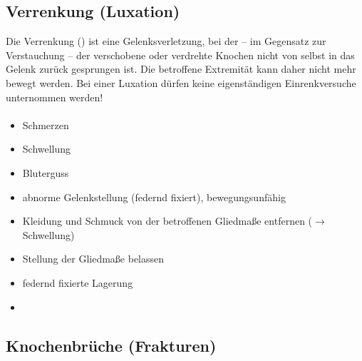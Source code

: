 \subsection{Verrenkung (Luxation)}
\label{topic:verrenkung}


Die Verrenkung () ist eine Gelenksverletzung, bei der -- im Gegensatz
zur Verstauchung -- der verschobene oder verdrehte Knochen nicht von selbst in
das Gelenk zurück gesprungen ist. Die betroffene Extremität kann daher nicht mehr
bewegt werden. Bei einer Luxation dürfen keine eigenständigen Einrenkversuche
unternommen werden!

\paragraph{\TxSymptome}
\begin{itemize}
  \item Schmerzen
  \item Schwellung
  \item Bluterguss
  \item abnorme Gelenkstellung (federnd fixiert), bewegungsunfähig
\end{itemize}

{
\begin{itemize}
  \item Kleidung und Schmuck von der betroffenen Gliedmaße entfernen 
  ($\rightarrow$ Schwellung)
  \item Stellung der Gliedmaße belassen
  \item federnd fixierte Lagerung
  \item {}
\end{itemize}
}



\subsection{Knochenbrüche (Frakturen)}
\label{topic:frakturen}


